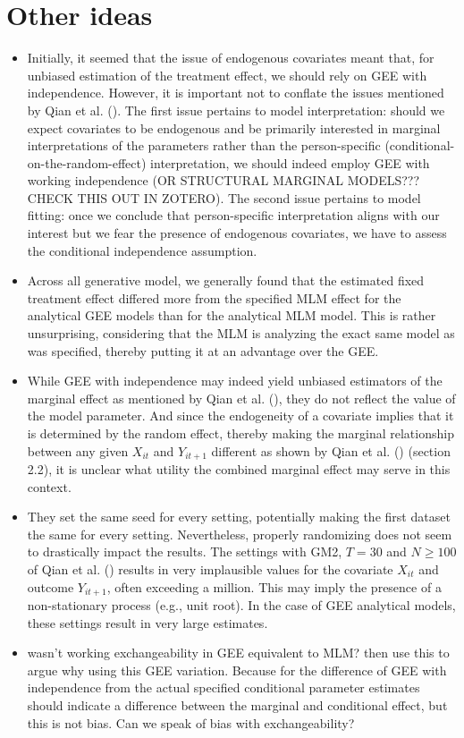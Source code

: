 \documentclass[
  12pt,
  a4paper,
]{article}
\begin{document}
\section{Other ideas}\label{other-ideas}

\begin{itemize}
\item
  Initially, it seemed that the issue of endogenous covariates meant
  that, for unbiased estimation of the treatment effect, we should rely
  on GEE with independence. However, it is important not to conflate the
  issues mentioned by Qian et al. (). The
  first issue pertains to model interpretation: should we expect
  covariates to be endogenous and be primarily interested in marginal
  interpretations of the parameters rather than the person-specific
  (conditional-on-the-random-effect) interpretation, we should indeed
  employ GEE with working independence (OR STRUCTURAL MARGINAL MODELS???
  CHECK THIS OUT IN ZOTERO). The second issue pertains to model fitting:
  once we conclude that person-specific interpretation aligns with our
  interest but we fear the presence of endogenous covariates, we have to
  assess the conditional independence assumption.
\item
  Across all generative model, we generally found that the estimated
  fixed treatment effect differed more from the specified MLM effect for
  the analytical GEE models than for the analytical MLM model. This is
  rather unsurprising, considering that the MLM is analyzing the exact
  same model as was specified, thereby putting it at an advantage over
  the GEE.
\item
  While GEE with independence may indeed yield unbiased estimators of
  the marginal effect as mentioned by Qian et al.
  (), they do not reflect the value of the
  model parameter. And since the endogeneity of a covariate implies that
  it is determined by the random effect, thereby making the marginal
  relationship between any given \(X_{it}\) and \(Y_{it+1}\) different
  as shown by Qian et al. () (section 2.2),
  it is unclear what utility the combined marginal effect may serve in
  this context.
\item
  They set the same seed for every setting, potentially making the first
  dataset the same for every setting. Nevertheless, properly randomizing
  does not seem to drastically impact the results. The settings with
  GM2, \(T = 30\) and \(N \geq 100\) of Qian et al.
  () results in very implausible values for
  the covariate \(X_{it}\) and outcome \(Y_{it+1}\), often exceeding a
  million. This may imply the presence of a non-stationary process
  (e.g., unit root). In the case of GEE analytical models, these
  settings result in very large estimates.
\item
  wasn't working exchangeability in GEE equivalent to MLM? then use this
  to argue why using this GEE variation. Because for the difference of
  GEE with independence from the actual specified conditional parameter
  estimates should indicate a difference between the marginal and
  conditional effect, but this is not bias. Can we speak of bias with
  exchangeability?


\end{itemize}
\end{document}
